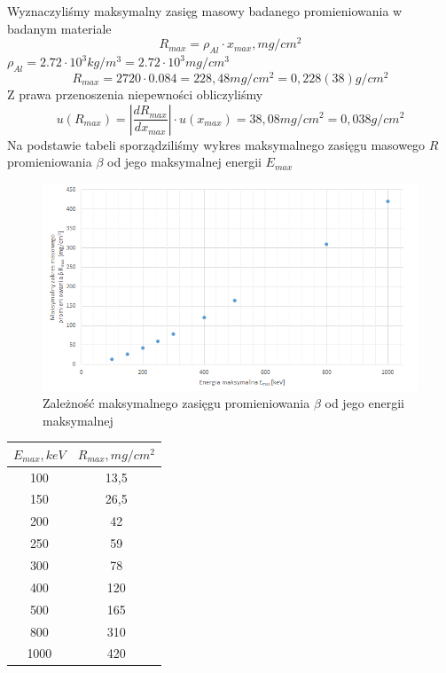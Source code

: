 \documentclass{article}
\begin{document}
Wyznaczyliśmy maksymalny zasięg masowy badanego promieniowania w badanym materiale
$$R_{max}=\rho _{Al}\cdot x_{max}, mg/cm^2$$
$\rho _{Al}=2.72\cdot 10^3kg/m^3=2.72\cdot 10^3mg/cm^3$
$$R_{max}=2720\cdot 0.084 = 228,48mg/cm^2=0,228(38)g/cm^2$$
Z prawa przenoszenia niepewności obliczyliśmy 
$$u(R_{max})=|\frac{dR_{max}}{dx_{max}}|\cdot u(x_{max})=38,08mg/cm^2=0,038g/cm^2$$
Na podstawie tabeli sporządziliśmy wykres maksymalnego zasięgu masowego $R$ promieniowania $\beta$ od jego maksymalnej energii $E_{max}$\\

\newpage
\begin{figure}[ht]
\caption{Zależność maksymalnego zasięgu promieniowania $\beta$ od jego energii maksymalnej}
\centering
\includegraphics{wykres3.png}
\end{figure}

\begin{table}
\centering
\begin{tabular}{|c|c|}
\hline
$E_{max}, keV$ & $R_{max}, mg/cm^2$ \\ \hline
100       & 13,5         \\ \hline
150       & 26,5         \\ \hline
200       & 42           \\ \hline
250       & 59           \\ \hline
300       & 78           \\ \hline
400       & 120          \\ \hline
500       & 165          \\ \hline
800       & 310          \\ \hline
1000      & 420          \\ \hline
\end{tabular}
\end{table}
\end{document}
